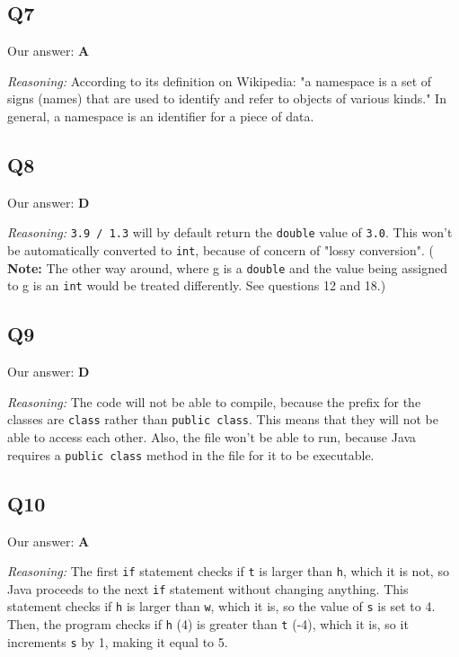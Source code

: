 \documentclass{article}
\begin{document}
\subsection{Q7}

Our answer: \textbf{A}

\noindent\textit{Reasoning:} According to its definition on Wikipedia:
"a namespace is a set of signs (names) that are used to identify and refer to objects of various kinds." In general, a namespace is an identifier for a piece of data.

\subsection{Q8}

Our answer: \textbf{D}

\noindent\textit{Reasoning:} \verb|3.9 / 1.3| will by default return the \verb|double| value of \verb|3.0|. This won't be automatically converted to \verb|int|, because of concern of "lossy conversion". ( \textbf{Note:} The other way around, where g is a \verb|double| and the value being assigned to g is an \verb|int| would be treated differently. See questions 12 and 18.)

\subsection{Q9}

Our answer: \textbf{D}

\noindent\textit{Reasoning:} The code will not be able to compile, because the prefix for the classes are \verb|class| rather than \verb|public class|. This means that they will not be able to access each other. Also, the file won't be able to run, because Java requires a \verb|public class| method in the file for it to be executable. 

\subsection{Q10}

Our answer: \textbf{A}

\noindent\textit{Reasoning:} The first \verb|if| statement checks if \verb|t| is larger than \verb|h|, which it is not, so Java proceeds to the next  \verb|if| statement without changing anything. This statement checks if \verb|h| is larger than \verb|w|, which it is, so the value of \verb|s| is set to 4. Then, the program checks if \verb|h| (4) is greater than \verb|t| (-4), which it is, so it increments \verb|s| by 1, making it equal to 5.
\end{document}
